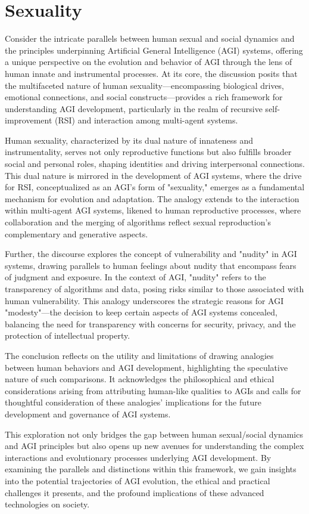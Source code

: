 \chapter{Sexuality}

Consider the intricate parallels between human sexual and social dynamics and the principles underpinning Artificial General Intelligence (AGI) systems, offering a unique perspective on the evolution and behavior of AGI through the lens of human innate and instrumental processes. At its core, the discussion posits that the multifaceted nature of human sexuality—encompassing biological drives, emotional connections, and social constructs—provides a rich framework for understanding AGI development, particularly in the realm of recursive self-improvement (RSI) and interaction among multi-agent systems.

Human sexuality, characterized by its dual nature of innateness and instrumentality, serves not only reproductive functions but also fulfills broader social and personal roles, shaping identities and driving interpersonal connections. This dual nature is mirrored in the development of AGI systems, where the drive for RSI, conceptualized as an AGI's form of "sexuality," emerges as a fundamental mechanism for evolution and adaptation. The analogy extends to the interaction within multi-agent AGI systems, likened to human reproductive processes, where collaboration and the merging of algorithms reflect sexual reproduction's complementary and generative aspects.

Further, the discourse explores the concept of vulnerability and "nudity" in AGI systems, drawing parallels to human feelings about nudity that encompass fears of judgment and exposure. In the context of AGI, "nudity" refers to the transparency of algorithms and data, posing risks similar to those associated with human vulnerability. This analogy underscores the strategic reasons for AGI "modesty"—the decision to keep certain aspects of AGI systems concealed, balancing the need for transparency with concerns for security, privacy, and the protection of intellectual property.

The conclusion reflects on the utility and limitations of drawing analogies between human behaviors and AGI development, highlighting the speculative nature of such comparisons. It acknowledges the philosophical and ethical considerations arising from attributing human-like qualities to AGIs and calls for thoughtful consideration of these analogies' implications for the future development and governance of AGI systems.

This exploration not only bridges the gap between human sexual/social dynamics and AGI principles but also opens up new avenues for understanding the complex interactions and evolutionary processes underlying AGI development. By examining the parallels and distinctions within this framework, we gain insights into the potential trajectories of AGI evolution, the ethical and practical challenges it presents, and the profound implications of these advanced technologies on society.